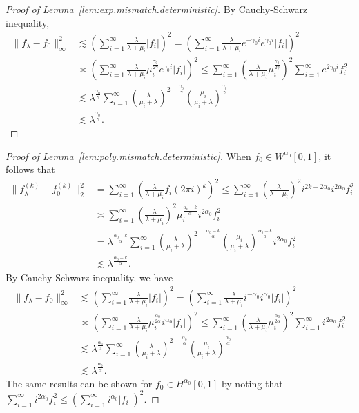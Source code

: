 \documentclass[12pt]{article}
\newcommand{\s}{\sum_{i=1}^{\infty}}
\theoremstyle{plain}
\theoremstyle{nonitalicremark}
\begin{document}
\begin{appendices}
\begin{proof}[Proof of Lemma~\ref{lem:exp.mismatch.deterministic}]
By Cauchy-Schwarz inequality,
\begin{align}
\|f_\lambda - f_0\|_\infty^2 & \lesssim \left(\s \frac{\lambda}{\lambda + \mu_i} |f_i|\right)^2 = \left(\s \frac{\lambda}{\lambda + \mu_i} e^{-\gamma_0 i} e^{\gamma_0 i} |f_i|\right)^2\\
& \asymp \left(\s \frac{\lambda}{\lambda + \mu_i}  \mu_i^{\frac{\gamma_0}{2\gamma}} e^{\gamma_0 i} |f_i| \right)^2 \leq \s \left( \frac{\lambda}{\lambda + \mu_i}  \mu_i^{\frac{\gamma_0}{2\gamma}} \right)^2 \s e^{2\gamma_0 i} f_i^2 \\
&\lesssim \lambda^{\frac{\gamma_0}{\gamma}}\sum_{i=1}^{\infty} \left(\frac{\lambda}{\mu_i+\lambda}\right)^{2-\frac{\gamma_0}{\gamma}}\left(\frac{\mu_i}{\mu_i+\lambda}\right)^{\frac{\gamma_0}{\gamma}}\\
&\lesssim \lambda^{\frac{\gamma_0}{\gamma}}.
\end{align}
\end{proof}


\begin{proof}[Proof of Lemma~\ref{lem:poly.mismatch.deterministic}]
When $f_0\in W^{\alpha_0}[0,1]$, it follows that
\begin{align}
\|f_\lambda^{(k)} - f_0^{(k)}\|_2^2 & = \s \left( \frac{\lambda}{\lambda + \mu_i} f_i (2\pi i)^k \right)^2 \leq \s \left( \frac{\lambda}{\lambda + \mu_i} \right)^2 i^{2k-2\alpha_0}i^{2\alpha_0} f_i^2\\
& \asymp \s \left( \frac{\lambda}{\lambda + \mu_i} \right)^2  \mu_i^{\frac{\alpha_0-k}{\alpha}} i^{2\alpha_0} f_i^2\\
&=\lambda^{\frac{\alpha_0-k}{\alpha}}\sum_{i=1}^{\infty} \left(\frac{\lambda}{\mu_i+\lambda}\right)^{2-\frac{\alpha_0-k}{\alpha}}\left(\frac{\mu_i}{\mu_i+\lambda}\right)^{\frac{\alpha_0-k}{\alpha}} i^{2\alpha_0} f_i^2\\
&\lesssim \lambda^{\frac{\alpha_0-k}{\alpha}}.
\end{align}
By Cauchy-Schwarz inequality, we have
\begin{align}
\|f_\lambda - f_0\|_\infty^2 & \lesssim \left(\s \frac{\lambda}{\lambda + \mu_i} |f_i|\right)^2 = \left(\s \frac{\lambda}{\lambda + \mu_i} i^{-\alpha_0}i^{\alpha_0} |f_i|\right)^2\\
& \asymp \left(\s \frac{\lambda}{\lambda + \mu_i}  \mu_i^{\frac{\alpha_0}{2\alpha}} i^{\alpha_0} |f_i| \right)^2 \leq \s \left( \frac{\lambda}{\lambda + \mu_i}  \mu_i^{\frac{\alpha_0}{2\alpha}} \right)^2 \s i^{2\alpha_0} f_i^2 \\
&\lesssim \lambda^{\frac{\alpha_0}{\alpha}}\sum_{i=1}^{\infty} \left(\frac{\lambda}{\mu_i+\lambda}\right)^{2-\frac{\alpha_0}{\alpha}}\left(\frac{\mu_i}{\mu_i+\lambda}\right)^{\frac{\alpha_0}{\alpha}}\\
\label{eq:f.lambda.f.0}&\lesssim \lambda^{\frac{\alpha_0}{\alpha}}.
\end{align}
The same results can be shown for $f_0\in H^{\alpha_0}[0,1]$ by noting that $\s i^{2\alpha_0} f_i^2 \leq \left(\s i^{\alpha_0} |f_i|\right)^2$.
\end{proof}



\end{appendices}
\end{document}
